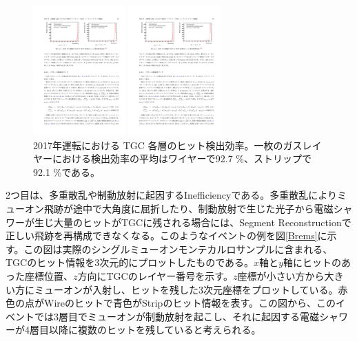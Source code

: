\begin{figure}
\begin{minipage}[b]{.5\linewidth}
\centering
\includegraphics[height=5cm]{fig/Test/tgchit_wire.pdf}
\end{minipage}%
\begin{minipage}[b]{.5\linewidth}
\centering
\includegraphics[height=5cm]{fig/Test/tgchit_strip.pdf}
\end{minipage}%
\caption[2017年運転における TGC 各層のヒット検出効率]{2017年運転における TGC 各層のヒット検出効率\cite{mt_kawaguchi}。一枚のガスレイヤーにおける検出効率の平均はワイヤーで92.7 \%、ストリップで92.1 \%である。}
\label{tgchit_efficiency}
\end{figure}

2つ目は、多重散乱や制動放射に起因するInefficiencyである。多重散乱によりミューオン飛跡が途中で大角度に屈折したり、制動放射で生じた光子から電磁シャワーが生じ大量のヒットがTGCに残される場合には、Segment Reconstructionで正しい飛跡を再構成できなくなる。このようなイベントの例を図\ref{Brems}に示す。この図は実際のシングルミューオンモンテカルロサンプルに含まれる、TGCのヒット情報を3次元的にプロットしたものである。$x$軸と$y$軸にヒットのあった座標位置、$z$方向にTGCのレイヤー番号を示す。$z$座標が小さい方から大きい方にミューオンが入射し、ヒットを残した3次元座標をプロットしている。赤色の点がWireのヒットで青色がStripのヒット情報を表す。この図から、このイベントでは3層目でミューオンが制動放射を起こし、それに起因する電磁シャワーが4層目以降に複数のヒットを残していると考えられる。

